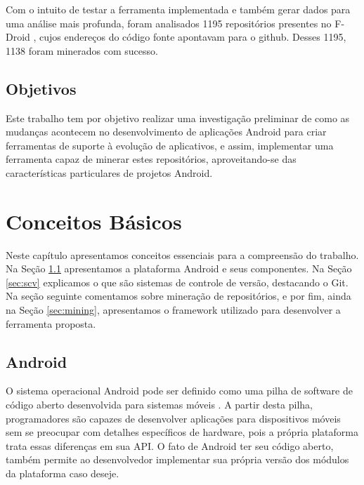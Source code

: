 \documentclass[a4paper,12pt]{article}
\begin{document}
Com o intuito de testar a ferramenta implementada e também gerar dados para uma análise  mais profunda, foram analisados 1195 repositórios presentes no F-Droid \cite{fdroid}, cujos endereços do código fonte apontavam para o github. Desses 1195, 1138 foram minerados com sucesso. 




\subsection{Objetivos}

Este trabalho tem por objetivo realizar uma investigação preliminar de como as mudanças acontecem no desenvolvimento de aplicações Android para criar ferramentas de suporte à evolução de aplicativos, e assim, implementar uma ferramenta capaz de minerar estes repositórios, aproveitando-se das características particulares de projetos Android.\\



\newpage

\section{Conceitos Básicos}

Neste capítulo apresentamos conceitos essenciais para a compreensão do trabalho. Na Seção \ref{sec:android} apresentamos a plataforma Android e seus componentes. Na Seção \ref{sec:scv} explicamos o que são sistemas de controle de versão, destacando o Git.  Na seção seguinte comentamos sobre mineração de repositórios, e por fim, ainda na Seção \ref{sec:mining}, apresentamos o framework utilizado para desenvolver a ferramenta proposta.

\subsection{Android}%
\label{sec:android}
O sistema operacional Android pode ser definido como uma pilha de software de código aberto desenvolvida para sistemas móveis \cite{androidSource}. A partir desta pilha, programadores são capazes de desenvolver aplicações para dispositivos móveis sem se preocupar com detalhes específicos de hardware, pois a própria plataforma trata essas diferenças em sua API. O fato de Android ter seu código aberto, também permite ao desenvolvedor implementar sua própria versão dos módulos da plataforma caso deseje.
\end{document}
